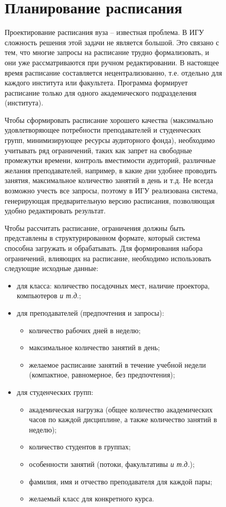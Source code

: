 \documentclass[ 

]{aiitart}
\begin{document}
\begin{figure}
\section{Планирование расписания} 

Проектирование расписания вуза -- известная проблема. В ИГУ сложность решения этой задачи не является большой. Это связано с тем, что многие запросы на расписание трудно формализовать, и они уже рассматриваются при ручном редактировании. В настоящее время расписание составляется нецентрализованно, т.е. отдельно для каждого института или факультета.  Программа формирует расписание только для одного академического подразделения (института). 

Чтобы сформировать расписание хорошего качества (максимально удовлетворяющее потребности преподавателей и студенческих групп, минимизирующее ресурсы аудиторного фонда), необходимо учитывать ряд ограничений, таких как запрет на свободные промежутки времени, контроль вместимости аудиторий, различные желания преподавателей, например, в какие дни удобнее проводить занятия, максимальное количество занятий в день и т.д. Не всегда возможно учесть все запросы, поэтому в ИГУ реализована система, генерирующая предварительную версию расписания, позволяющая удобно редактировать результат. 

Чтобы рассчитать расписание, ограничения должны быть представлены в структурированном формате, который система способна загружать и обрабатывать. Для формирования набора ограничений, влияющих на расписание, необходимо использовать следующие исходные данные: 
\begin{itemize} 
\item для класса: количество посадочных мест, наличие проектора, компьютеров \emph{и т.д}.; 
\item для преподавателей (предпочтения и запросы): 
\begin{itemize} 
\item количество рабочих дней в неделю; 
\item максимальное количество занятий в день; 
\item желаемое расписание занятий в течение учебной недели (компактное, равномерное, без предпочтения); 
\end{itemize} 
\item для студенческих групп: 
\begin{itemize} 
\item академическая нагрузка (общее количество академических часов по каждой дисциплине, а также количество занятий в неделю); \item количество студентов в группах; 
\item особенности занятий (потоки, факультативы \emph{и т.д.}); \item фамилия, имя и отчество преподавателя для каждой пары; 
\item желаемый класс для конкретного курса.
\end{itemize}
\end{itemize} 


\end{figure}
\end{document}
